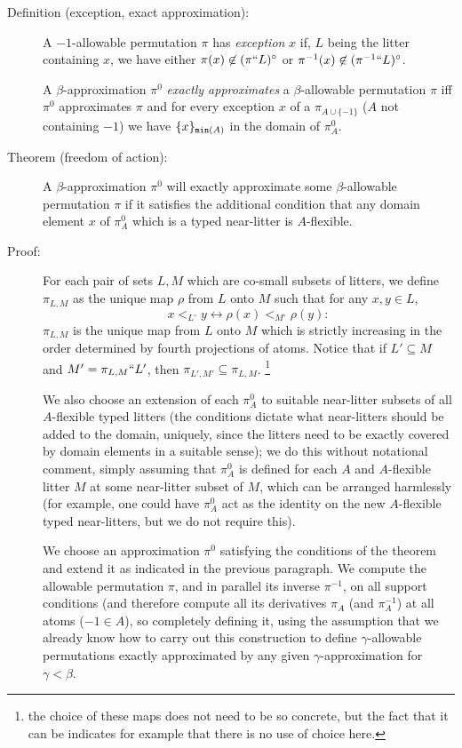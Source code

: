 \documentclass[112pt]{article}
\begin{document}
\begin{description}
\item[Definition (exception, exact approximation):]  A $-1$-allowable permutation $\pi$ has {\em exception\/} $x$ if, $L$ being the litter containing $x$,
we have either $\pi(x) \not\in (\pi``L)^\circ$ or $\pi^{-1}(x) \not\in (\pi^{-1}``L)^\circ$.

A $\beta$-approximation $\pi^0$ {\em exactly approximates\/} a $\beta$-allowable permutation $\pi$ iff $\pi^0$ approximates $\pi$ and
for every exception $x$ of a $\pi_{A \cup \{-1\}}$ ($A$ not containing $-1$) we have $\{x\}_{{\tt min}(A)}$ in the domain of $\pi^0_A$.

\item[Theorem (freedom of action):]  A $\beta$-approximation $\pi^0$ will exactly approximate some $\beta$-allowable permutation $\pi$ if it satisfies the additional condition that any domain element $x$ of $\pi^0_A$ which is a typed near-litter is $A$-flexible.

\item[Proof:]   For each pair of sets $L,M$ which are co-small subsets of litters, we define $\pi_{L,M}$ as the unique map $\rho$ from $L$ onto $M$ such
that for any $x,y \in L$, $$x <_{L^{\circ}} y \leftrightarrow \rho(x) <_{M^\circ} \rho(y):$$  $\pi_{L,M}$ is the unique map from $L$ onto $M$ which is strictly increasing in the order determined by fourth projections of atoms.  Notice that if $L' \subseteq M$ and $M' = \pi_{L,M}``L'$, then $\pi_{L',M'} \subseteq \pi_{L,M}$.  \footnote{the choice of these maps does not need to be so concrete, but the fact that it can be indicates for example that there is no use of choice here.}

We also choose an extension of each  $\pi^0_A$ to suitable near-litter subsets of all $A$-flexible typed litters (the conditions dictate what near-litters should be added to the domain, uniquely, since the litters need to be exactly covered by domain elements in a suitable sense);  we do this without notational comment, simply assuming that $\pi^0_A$ is defined for each $A$ and $A$-flexible litter $M$ at some near-litter subset of $M$, which can be arranged harmlessly
(for example, one could have $\pi^0_A$ act as the identity on the new $A$-flexible typed near-litters, but we do not require this).

We choose an approximation $\pi^0$ satisfying the conditions of the theorem and extend it as indicated in the previous paragraph.  We compute the allowable permutation $\pi$, and in parallel its inverse $\pi^{-1}$, on
all support conditions (and therefore compute all its derivatives $\pi_A$ (and $\pi^{-1}_A$) at all atoms ($-1 \in A$), so completely defining it, using the assumption that we already know how to carry out this construction to
define $\gamma$-allowable permutations exactly approximated by any given $\gamma$-approximation for $\gamma<\beta$.


\end{description}
\end{document}
